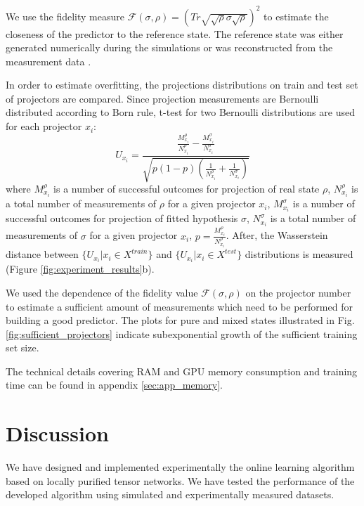 \documentclass[%
 reprint,
 amsmath,amssymb,
 aps,
]{revtex4-2}
\begin{document}
We use the fidelity measure $\mathcal{F}(\sigma,\rho)=(Tr\sqrt{\sqrt{\rho}\sigma\sqrt{\rho}})^2$ to estimate the closeness of the predictor to the reference state. The reference state was either generated numerically during the simulations or was reconstructed from the measurement data \cite{Kovlakov2018}.

In order to estimate overfitting, the projections distributions on train and test set of projectors are compared. Since projection measurements are Bernoulli distributed according to Born rule, t-test for two Bernoulli distributions are used for each projector $x_i$:
\begin{equation}
    U_{x_i} = \frac{\frac{M_{x_i}^{\rho}}{N_{x_i}^{\rho}}-\frac{M_{x_i}^{\sigma}}{N_{x_i}^{\sigma}}}{\sqrt{p(1-p)(\frac{1}{N_{x_i}^{\rho}}+\frac{1}{N_{x_i}^{\sigma}})}}
\end{equation}
where $M_{x_i}^{\rho}$ is a number of successful outcomes for projection of real state $\rho$, $N_{x_i}^{\rho}$ is a total number of measurements of $\rho$ for a given projector $x_i$, $M_{x_i}^{\sigma}$ is a number of successful outcomes for projection of fitted hypothesis $\sigma$, $N_{x_i}^{\sigma}$ is a total number of measurements of $\sigma$ for a given projector $x_i$, $p=\frac{M_{x_i}^{\rho}}{N_{x_i}^{\rho}}$.
After, the Wasserstein distance between $\{U_{x_i}|x_i\in X^{train}\}$ and $\{U_{x_i}|x_i\in X^{test}\}$ distributions is measured (Figure \ref{fig:experiment_results}b).


We used the dependence of the fidelity value $\mathcal{F}(\sigma,\rho)$ on the projector number to estimate a sufficient amount of measurements which need to be performed for building a good predictor. The plots for pure and mixed states illustrated in Fig.\ref{fig:sufficient_projectors} indicate subexponential growth of the sufficient training set size.


The technical details covering RAM and GPU memory consumption and training time can be found in appendix \ref{sec:app_memory}.

\section{\label{sec:discuss}Discussion}

We have designed and implemented experimentally the online learning algorithm based on locally purified tensor networks. We have tested the performance of the developed algorithm using simulated and experimentally measured datasets.
\end{document}
